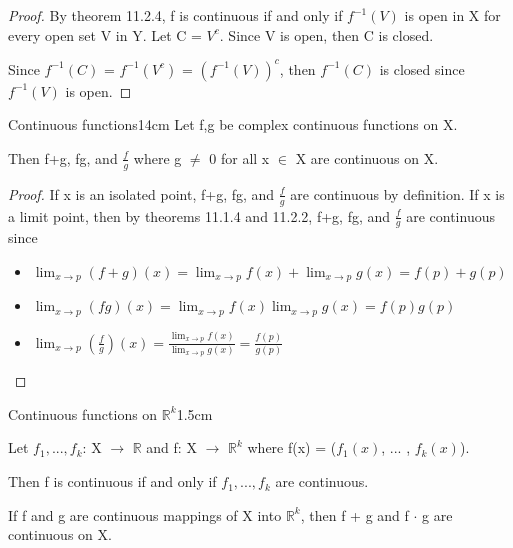     \begin{proof}
        By {\color{red} theorem 11.2.4}, f is continuous
        if and only if $f^{-1}(V)$ is open in X for every open set V in Y.
        Let C = $V^c$.
        Since V is open, then C is closed.

        Since $f^{-1}(C)$
        = $f^{-1}(V^c)$
        = $(f^{-1}(V))^c$,
        then $f^{-1}(C)$ is closed since $f^{-1}(V)$ is open.
    \end{proof}

    \vspace{0.5cm}



    \begin{wtheorem}{Continuous functions}{14cm}
        Let f,g be complex continuous functions on X.

        Then f+g, fg, and $\frac{f}{g}$ where g $\not =$ 0 for all x $\in$ X
        are continuous on X.
    \end{wtheorem}

    \begin{proof}
        If x is an isolated point, f+g, fg, and $\frac{f}{g}$
        are continuous by definition.
        If x is a limit point, then by {\color{red} theorems 11.1.4 and 11.2.2},
        f+g, fg, and $\frac{f}{g}$ are continuous since

        \begin{itemize}[leftmargin=1cm, itemsep=0.1cm]
            \item $\lim_{x \rightarrow p} (f+g)(x)
                = \lim_{x \rightarrow p} f(x) + \lim_{x \rightarrow p} g(x)
                = f(p) + g(p)$
            \item $\lim_{x \rightarrow p} (fg)(x)
                = \lim_{x \rightarrow p} f(x) \lim_{x \rightarrow p} g(x)
                = f(p) g(p)$
            \item $\lim_{x \rightarrow p} (\frac{f}{g})(x)
                = \frac{\lim_{x \rightarrow p} f(x)}{\lim_{x \rightarrow p} g(x)}
                = \frac{f(p)}{g(p)}$
        \end{itemize}
    \end{proof}

    \vspace{0.5cm}



    \begin{ltheorem}{Continuous functions on $\mathbb{R}^k$}{1.5cm}
        \item Let $f_1,...,f_k$: X $\rightarrow$ $\mathbb{R}$ and
            f: X $\rightarrow$ $\mathbb{R}^k$ where
            f(x) = ($f_1(x)$, ... , $f_k(x)$).

            Then f is continuous if and only if $f_1,...,f_k$ are continuous.

        \item If f and g are continuous mappings of X into $\mathbb{R}^k$,
            then f + g and f $\cdot$ g are continuous on X.
    \end{ltheorem}

